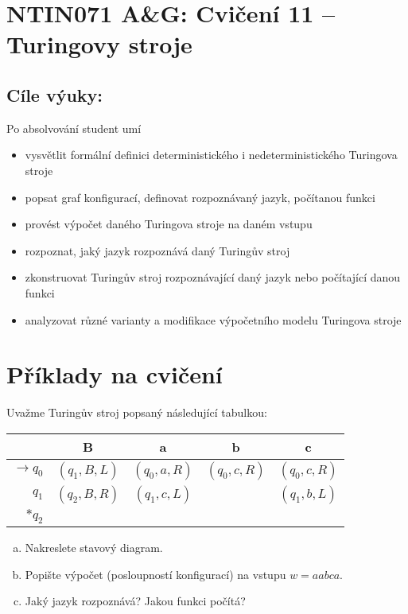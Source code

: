 \documentclass[a4paper,12pt]{amsart}
\begin{document}
\thispagestyle{empty}

\section*{NTIN071 A\&G: Cvičení 11 -- Turingovy stroje}

\medskip

\subsection*{Cíle výuky:} Po absolvování student umí

\begin{itemize}\setlength{\itemsep}{0pt}
    \item vysvětlit formální definici deterministického i nedeterministického Turingova stroje
    \item popsat graf konfigurací, definovat rozpoznávaný jazyk, počítanou funkci
    \item provést výpočet daného Turingova stroje na daném vstupu
    \item rozpoznat, jaký jazyk rozpoznává daný Turingův stroj
    \item zkonstruovat Turingův stroj rozpoznávající daný jazyk nebo počítající danou funkci
    \item analyzovat různé varianty a modifikace výpočetního modelu Turingova stroje
\end{itemize}

\section*{Příklady na cvičení}

\begin{problem}
    
    Uvažme Turingův stroj popsaný následující tabulkou:
    
    \begin{table}[h]
    \begin{tabular}{r|cccc}
    & B   & a    & b    &  c  \\ \hline
    $\to q_0$ & $(q_1, B, L)$ & $(q_0, a, R)$ & $(q_0, c, R)$ & $(q_0, c, R)$ \\
    $q_1$ & $(q_2, B, R)$ & $(q_1, c, L)$ &  & $(q_1, b, L)$ \\
    $\ast q_2$  &              &              &              &             
    \end{tabular}
    \end{table}
    
    \begin{enumerate}[(a)]
        \item Nakreslete stavový diagram.
        \item Popište výpočet (posloupností konfigurací) na vstupu $w=aabca$.
        \item Jaký jazyk rozpoznává? Jakou funkci počítá?
    \end{enumerate}

\end{problem}
\end{document}
